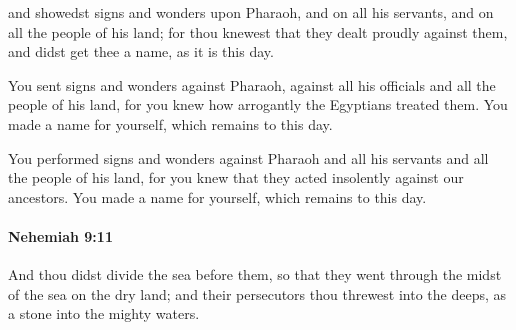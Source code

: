 			\begin{versebox}
					\item[BHS] 
					\item[LXX] 
					\item[ASV] and showedst signs and wonders upon Pharaoh, and on all his servants, and on all the people of his land; for thou knewest that they dealt proudly against them, and didst get thee a name, as it is this day.
					\item[NIV] You sent signs and wonders against Pharaoh, against all his officials and all the people of his land, for you knew how arrogantly the Egyptians treated them. You made a name for yourself, which remains to this day.
					\item[NRSV] You performed signs and wonders against Pharaoh and all his servants and all the people of his land, for you knew that they acted insolently against our ancestors. You made a name for yourself, which remains to this day.
			\end{versebox}

		\paragraph{Nehemiah 9:11} %
			\label{NEHEMIAH-9-11}

			And thou didst divide the sea before them, so that they went through the midst of the sea on the dry land; and their persecutors thou threwest into the deeps, as a stone into the mighty waters.

